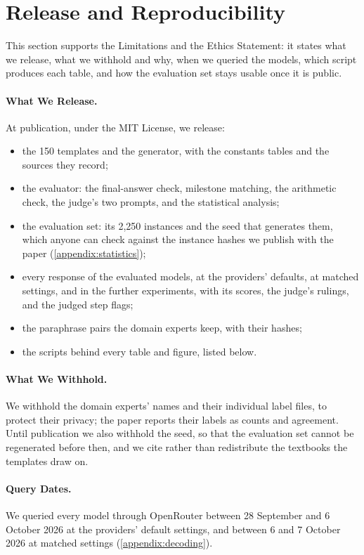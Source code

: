 \section{Release and Reproducibility}
\label{appendix:release}

This section supports the Limitations and the Ethics Statement: it states what we release, what we
withhold and why, when we queried the models, which script produces each table, and how the
evaluation set stays usable once it is public.

\paragraph{What We Release.} At publication, under the MIT License, we release:
\begin{itemize}[nosep, leftmargin=*]
\item the 150 templates and the generator, with the constants tables and the sources they record;
\item the evaluator: the final-answer check, milestone matching, the arithmetic check, the judge's
two prompts, and the statistical analysis;
\item the evaluation set: its 2,250 instances and the seed that generates them, which anyone can
check against the instance hashes we publish with the paper (\autoref{appendix:statistics});
\item every response of the evaluated models, at the providers' defaults, at matched settings, and
in the further experiments, with its scores, the judge's rulings, and the judged step flags;
\item the paraphrase pairs the domain experts keep, with their hashes;
\item the scripts behind every table and figure, listed below.
\end{itemize}

\paragraph{What We Withhold.} We withhold the domain experts' names and their individual label
files, to protect their privacy; the paper reports their labels as counts and agreement.
Until publication we also withhold the seed, so that the evaluation set cannot be regenerated before
then, and we cite rather than redistribute the textbooks the templates draw on.

\paragraph{Query Dates.} We queried every model through OpenRouter between 28 September and
6 October 2026 at the providers' default settings, and between 6 and 7 October 2026 at matched
settings (\autoref{appendix:decoding}).

